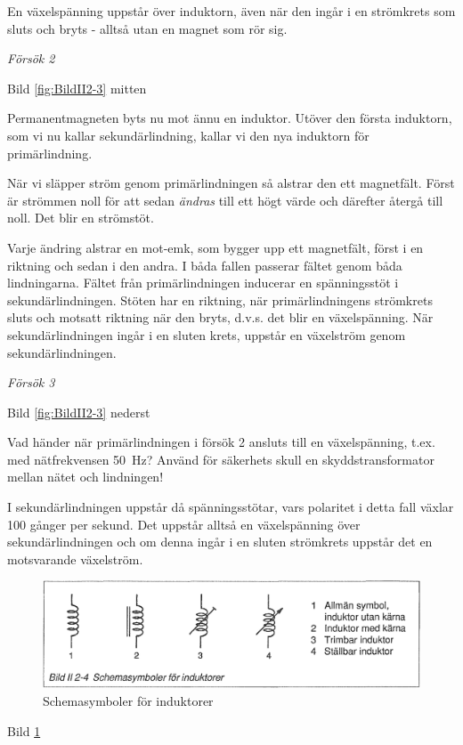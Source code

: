 En växelspänning uppstår över induktorn, även när den ingår i en strömkrets som
sluts och bryts - alltså utan en magnet som rör sig.

\emph{Försök 2}

Bild \ref{fig:BildII2-3} mitten

Permanentmagneten byts nu mot ännu en induktor. Utöver den första induktorn, som
vi nu kallar sekundärlindning, kallar vi den nya induktorn för primärlindning.

När vi släpper ström genom primärlindningen så alstrar den ett magnetfält. Först
är strömmen noll för att sedan \emph{ändras} till ett högt värde och därefter
återgå till noll. Det blir en strömstöt.

Varje ändring alstrar en mot-emk, som bygger upp ett magnetfält, först i en
riktning och sedan i den andra. I båda fallen passerar fältet genom båda
lindningarna. Fältet från primärlindningen inducerar en spänningsstöt i
sekundärlindningen. Stöten har en riktning, när primärlindningens strömkrets
sluts och motsatt riktning när den bryts, d.v.s. det blir en växelspänning.
När sekundärlindningen ingår i en sluten krets, uppstår en växelström genom
sekundärlindningen.

\emph{Försök 3}


Bild \ref{fig:BildII2-3} nederst

Vad händer när primärlindningen i försök 2 ansluts till en växelspänning, t.ex.
med nätfrekvensen 50~Hz? Använd för säkerhets skull en skyddstransformator
mellan nätet och lindningen!

I sekundärlindningen uppstår då spänningsstötar, vars polaritet i detta fall
växlar 100 gånger per sekund. Det uppstår alltså en växelspänning över
sekundärlindningen och om denna ingår i en sluten strömkrets uppstår det en
motsvarande växelström.


\begin{figure}
\includegraphics[width=\textwidth]{images/bild_2_2-04}
\caption{Schemasymboler för induktorer}
\label{fig:BildII2-4}
\end{figure}

Bild \ref{fig:BildII2-4}

